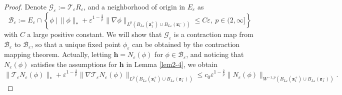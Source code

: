 \documentclass[12pt,reqno]{amsart}
\numberwithin{equation}{section}
\theoremstyle{definition}
\theoremstyle{remark}
\begin{document}
	\begin{proof}
		Denote $\mathcal G_\varepsilon:=\mathcal T_\varepsilon R_\varepsilon$, and a neighborhood of origin in $E_\varepsilon$ as
		\begin{equation*}
			\mathcal B_\varepsilon:=E_\varepsilon\cap \left\{\phi \ | \ \|\phi\|_*+\varepsilon^{1-\frac{2}{p}}\|\nabla\phi\|_{L^p(B_{L\varepsilon}(\boldsymbol z_1^+)\cup B_{L\varepsilon}(\boldsymbol z_1^-))}\le C\varepsilon, \ p\in(2,\infty]\right\}
		\end{equation*}
		with $C$ a large positive constant. We will show that $\mathcal G_\varepsilon$ is a contraction map from $\mathcal B_\varepsilon$ to $\mathcal B_\varepsilon$, so that a unique fixed point $\phi_\varepsilon$ can be obtained by the contraction mapping theorem. Actually, letting $\mathbf h=N_\varepsilon(\phi)$ for $\phi\in\mathcal B_\varepsilon$, and noticing that $N_\varepsilon(\phi)$ satisfies the assumptions for $\mathbf h$ in Lemma \ref{lem2-4}, we obtain
		\begin{equation*}
			\|\mathcal T_\varepsilon N_\varepsilon(\phi)\|_*+\varepsilon^{1-\frac{2}{p}}\|\nabla\mathcal T_\varepsilon N_\varepsilon(\phi)\|_{L^p(B_{L\varepsilon}(\boldsymbol z_1^+)\cup B_{L\varepsilon}(\boldsymbol z_1^-))}\le c_0\varepsilon^{1-\frac{2}{p}}\|N_\varepsilon(\phi) \|_{W^{-1,p}(B_{L\varepsilon}(\boldsymbol z_1^+)\cup B_{L\varepsilon}(\boldsymbol z_1^-))}.
		\end{equation*}
		

\end{proof}
\end{document}
